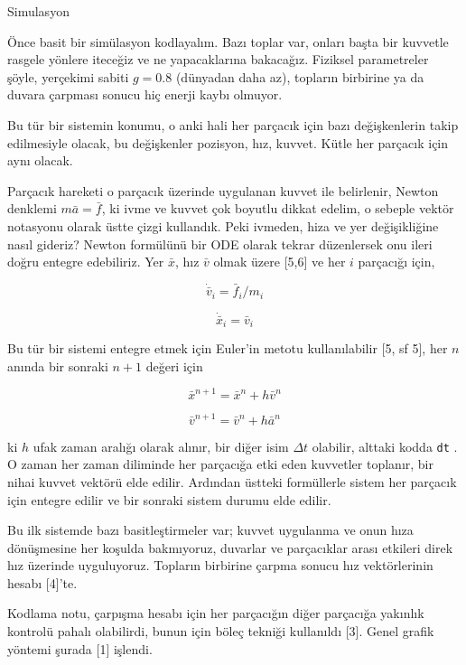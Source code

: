 \documentclass[12pt,fleqn]{article}\usepackage{../../common}
\begin{document}
Simulasyon

Önce basit bir simülasyon kodlayalım. Bazı toplar var, onları başta bir kuvvetle
rasgele yönlere iteceğiz ve ne yapacaklarına bakacağız. Fiziksel parametreler
şöyle, yerçekimi sabiti $g = 0.8$ (dünyadan daha az), topların birbirine ya da
duvara çarpması sonucu hiç enerji kaybı olmuyor.

Bu tür bir sistemin konumu, o anki hali her parçacık için bazı değişkenlerin
takip edilmesiyle olacak, bu değişkenler pozisyon, hız, kuvvet. Kütle her
parçacık için aynı olacak.

Parçacık hareketi o parçacık üzerinde uygulanan kuvvet ile belirlenir, Newton
denklemi $m \bar{a} = \bar{f}$, ki ivme ve kuvvet çok boyutlu dikkat edelim, o
sebeple vektör notasyonu olarak üstte çizgi kullandık. Peki ivmeden, hiza ve yer
değişikliğine nasıl gideriz? Newton formülünü bir ODE olarak tekrar düzenlersek
onu ileri doğru entegre edebiliriz. Yer $\bar{x}$, hız $\bar{v}$ olmak üzere
[5,6] ve her $i$ parçacığı için,

$$
\dot{\bar{v}}_i = \bar{f}_i / m_i
$$

$$
\dot{\bar{x}}_i = \bar{v}_i
$$

Bu tür bir sistemi entegre etmek için Euler'in metotu kullanılabilir [5, sf 5],
her $n$ anında bir sonraki $n+1$ değeri için

$$
\bar{x}^{n+1} = \bar{x}^n + h \bar{v}^n
$$

$$
\bar{v}^{n+1} = \bar{v}^n + h \bar{a}^n
$$

ki $h$ ufak zaman aralığı olarak alınır, bir diğer isim $\Delta t$ olabilir,
alttaki kodda \verb!dt! . O zaman her zaman diliminde her parçacığa etki eden
kuvvetler toplanır, bir nihai kuvvet vektörü elde edilir. Ardından üstteki
formüllerle sistem her parçacık için entegre edilir ve bir sonraki sistem durumu
elde edilir.

Bu ilk sistemde bazı basitleştirmeler var; kuvvet uygulanma ve onun hıza
dönüşmesine her koşulda bakmıyoruz, duvarlar ve parçacıklar arası etkileri direk
hız üzerinde uyguluyoruz. Topların birbirine çarpma sonucu hız vektörlerinin
hesabı [4]'te.

Kodlama notu, çarpışma hesabı için her parçacığın diğer parçacığa yakınlık
kontrolü pahalı olabilirdi, bunun için böleç tekniği kullanıldı [3]. Genel
grafik yöntemi şurada [1] işlendi.

\inputminted[fontsize=\footnotesize]{python}{sim.py}
\end{document}
